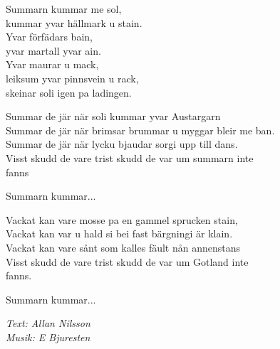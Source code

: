 \vspace{10pt}
Summarn kummar me sol,\\
kummar yvar hällmark u stain.\\
Yvar förfädars bain,\\
yvar martall yvar ain.\\
Yvar maurar u mack,\\
leiksum yvar pinnsvein u rack,\\
skeinar soli igen pa ladingen.\par
\vspace{10pt}
Summar de jär när soli kummar yvar Austargarn\\
Summar de jär när brimsar brummar u myggar bleir me ban.\\
Summar de jär när lycku bjaudar sorgi upp till dans.\\
Visst skudd de vare trist skudd de var um summarn inte \\
fanns\par
\vspace{10pt}
Summarn kummar...\par
\vspace{10pt}
Vackat kan vare mosse pa en gammel sprucken stain,\\
Vackat kan var u hald si bei fast bärgningi är klain.\\
Vackat kan vare sånt som kalles fäult nån annenstans\\
Visst skudd de vare trist skudd de var um Gotland inte \\
fanns.\par
\vspace{10pt}
Summarn kummar...\par
\vspace{10pt}
{\footnotesize\textit{Text: Allan Nilsson\\ Musik: E Bjuresten}}
